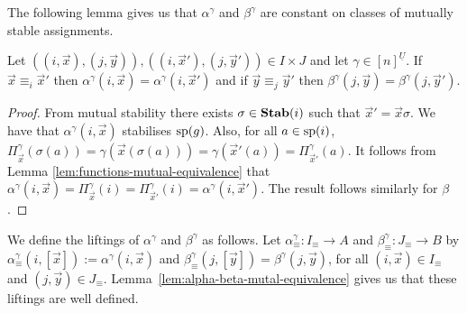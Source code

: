 \documentclass[../paper.tex]{subfiles}
\begin{document}

The following lemma gives us that $\alpha^{\gamma}$ and $\beta^{\gamma}$ are
constant on classes of mutually stable assignments.

\begin{lem}
	Let $((i, \vec{x}), (j, \vec{y})), ((i, \vec{x}'), (j, \vec{y}')) \in I \times
  J$ and let $\gamma \in [n]^{\underline{U}}$. If $\vec{x} \equiv_i \vec{x}'$
  then $\alpha^{\gamma}(i, \vec{x}) = \alpha^{\gamma}(i, \vec{x}')$ and if
  $\vec{y} \equiv_j \vec{y}'$ then $\beta^{\gamma}(j, \vec{y}) =
  \beta^{\gamma}(j, \vec{y}')$.
	\label{lem:alpha-beta-mutal-equivalence}
\end{lem}
\begin{proof}
	From mutual stability there exists $\sigma \in \text{\textbf{Stab}}(i)$ such that $\vec{x}'
  = \vec{x} \sigma$. We have that $\alpha^{\gamma}(i, \vec{x})$ stabilises
  $\text{sp}(g)$. Also, for all $a \in \text{sp}(i)$, $\Pi^{\gamma}_{\vec{x}} (\sigma
  (a)) = \gamma (\vec{x}(\sigma (a))) = \gamma (\vec{x}'(a)) =
  \Pi^{\gamma}_{\vec{x}'}(a)$. It follows from Lemma
  \ref{lem:functions-mutual-equivalence} that $\alpha^{\gamma}(i,\vec{x}) =
  \Pi^{\gamma}_{\vec{x}} (i) = \Pi^{\gamma}_{\vec{x}'}(i) = \alpha^{\gamma}(i,
  \vec{x}')$. The result follows similarly for $\beta$.
\end{proof}

We define the liftings of $\alpha^{\gamma}$ and $\beta^{\gamma}$ as follows. Let
$\alpha^{\gamma}_{\equiv} : I_\equiv \rightarrow A$ and $\beta^{\gamma}_\equiv:
J_\equiv \rightarrow B$ by $\alpha^{\gamma}_{\equiv}(i, [\vec{x}]) :=
\alpha^{\gamma} (i, \vec{x})$ and $\beta^{\gamma}_{\equiv}(j, [\vec{y}]) =
\beta^{\gamma} (j, \vec{y})$, for all $(i, \vec{x}) \in I_{\equiv}$ and $(j,
\vec{y}) \in J_\equiv$. Lemma~\ref{lem:alpha-beta-mutal-equivalence} gives us
that these liftings are well defined.

\end{document}
